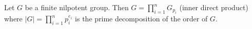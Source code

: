 Let $G$ be a finite nilpotent group. Then $G = \prod_{i=1}^n G_{p_i}$ (inner direct product) where $|G| = \prod_{i=1}^n p_i^{e_i}$ is the prime decomposition of the order of $G$.
